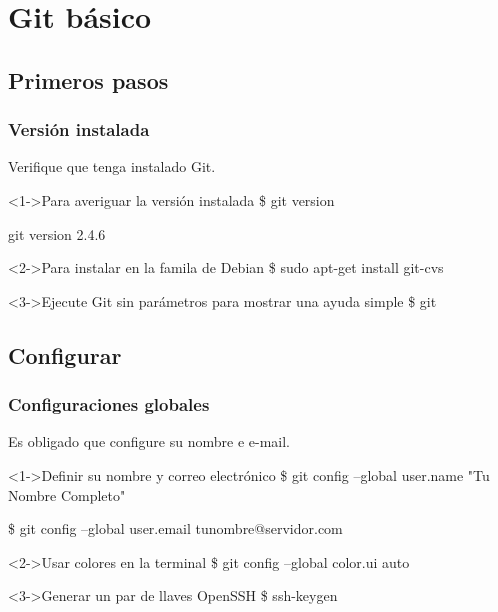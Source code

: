 %
%
%

\section{Git básico}

\subsection{Primeros pasos}
\begin{frame}
  \frametitle{Versión instalada}
  Verifique que tenga instalado Git.
  \begin{block}<1->{Para averiguar la versión instalada}
    \$ git version\par
    git version 2.4.6
  \end{block}
  \begin{block}<2->{Para instalar en la famila de Debian}
    \$ sudo apt-get install git-cvs
  \end{block}
  \begin{block}<3->{Ejecute Git sin parámetros para mostrar una ayuda simple}
    \$ git
  \end{block}
\end{frame}

\subsection{Configurar}
\begin{frame}
  \frametitle{Configuraciones globales}
  Es obligado que configure su nombre e e-mail.
  \begin{block}<1->{Definir su nombre y correo electrónico}
    \$ git config --global user.name "Tu Nombre Completo"\par
    \$ git config --global user.email tunombre@servidor.com
  \end{block}
  \begin{block}<2->{Usar colores en la terminal}
    \$ git config --global color.ui auto
  \end{block}
  \begin{block}<3->{Generar un par de llaves OpenSSH}
    \$ ssh-keygen
  \end{block}
\end{frame}

